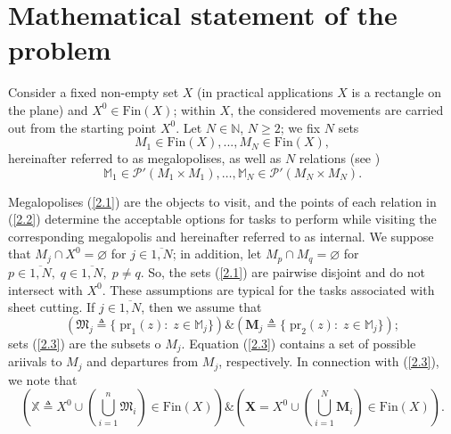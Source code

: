 \documentclass[numbers,sort&compress]{IntechOpen-Book}%
\begin{document}
\section{Mathematical statement of the problem}
\label{sec:2}

Consider a fixed non-empty set
$X$
(in practical applications
\cite{4}
$X$
is a rectangle on the plane)
and $X^0 \in \mathrm{Fin}(X)$;
within $ X $, the considered movements are carried out
from the starting point
$ X ^ 0 $.
Let $N \in \mathbb{N}$,
$N\ge 2$;
we fix $N$ sets
\begin{equation}\label{2.1}
M_1 \in \mathrm{Fin}(X),...,M_N \in \mathrm{Fin}(X),
\end{equation}
hereinafter referred to as megalopolises,
as well as
$N$
relations
(see \cite[chapter II, $\S$4]{15})
\begin{equation}\label{2.2}
\mathbb{M}_1 \in \mathcal{P}'(M_1 \times M_1), \dots ,
    \mathbb{M}_N \in \mathcal{P}'(M_N \times M_N).
\end{equation}

Megalopolises (\ref{2.1})
are the objects to visit,
and the points of each relation in (\ref{2.2})
determine the acceptable options for tasks to perform
while visiting the corresponding megalopolis
and hereinafter referred to as internal.
We suppose that
$M_j \cap X^0 = \varnothing$
for
$j \in \overline{1,N}$;
in addition, let
$M_p \cap M_q = \varnothing$
for
$p \in \overline{1,N},\;q \in \overline{1,N},\;p \ne q$.
So,
the sets (\ref{2.1})
are pairwise disjoint and do not intersect with
$ X ^ 0 $.
These assumptions are typical for the tasks
associated with sheet cutting.
If $j \in \overline{1,N}$,
then we assume that
\begin{equation}\label{2.3}
    (\mathfrak{M}_j {\triangleq}
    \{\;\mathrm{pr}_1(z):\;z \in \mathbb{M}_j\})
    \& (\mathbf{M}_j {\triangleq}
    \{\;\mathrm{pr}_2(z):\;z \in \mathbb{M}_j\})
    ;
\end{equation}
sets (\ref{2.3})
are the subsets o
$M_j$.
Equation (\ref{2.3})
contains a set of possible ariivals to
$M_j$
and departures from $M_j$,
respectively.
In connection with
 (\ref{2.3}),
we note that
$$
(\mathbb{X} {\triangleq} X^0 \cup
(\bigcup\limits_{i=1}^n \mathfrak{M}_i) \in \mathrm{Fin}(X))
\& (\mathbf{X} = X^0 \cup (\bigcup\limits_{i=1}^N \mathbf{M}_i) \in \mathrm{Fin}(X)).
$$
\end{document}
